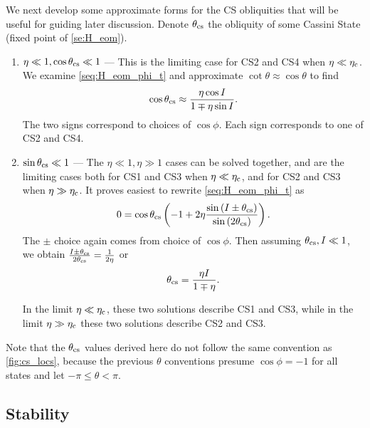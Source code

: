 \documentclass[
        fleqn,
        usenatbib,
        referee,
    ]{mnras}
\newcommand*{\p}[1]{\left(#1\right)}
\begin{document}
We next develop some approximate forms for the CS obliquities that will be
useful for guiding later discussion. Denote $\theta_{\rm cs}$ the obliquity of
some Cassini State (fixed point of \autoref{se:H_eom}).
\begin{enumerate}
    \item $\eta \ll 1, \cos \theta_{\rm cs} \ll 1$ --- This is the limiting case
        for CS2 and CS4 when $\eta \ll \eta_{\rm c}$. We examine
        \autoref{seq:H_eom_phi_t} and approximate $\cot \theta \approx \cos
        \theta$ to find
        \begin{equation}
            \cos \theta_{\rm cs} \approx \frac{\eta \cos I}
                {1 \mp \eta \sin I}.
        \end{equation}
        The two signs correspond to choices of $\cos \phi$. Each sign
        corresponds to one of CS2 and CS4.

    \item $\sin \theta_{\rm cs} \ll 1$ --- The $\eta \ll 1, \eta \gg 1$ cases
        can be solved together, and are the limiting cases both for CS1 and CS3
        when $\eta \ll \eta_{\rm c}$, and for CS2 and CS3 when $\eta \gg
        \eta_{\rm c}$. It proves easiest to rewrite \autoref{seq:H_eom_phi_t} as
        \begin{equation}
            0 = \cos \theta_{\rm cs}\p{-1 + 2\eta
                \frac{\sin \p{I \pm \theta_{\rm cs}}}{\sin \p{2\theta_{\rm
                    cs}}}}.\label{eq:rewritten_dphi}
        \end{equation}
        The $\pm$ choice again comes from choice of $\cos \phi$. Then assuming
        $\theta_{\rm cs}, I \ll 1$, we obtain $\frac{I \pm
        \theta_{\rm cs}}{2\theta_{\rm cs}} = \frac{1}{2\eta}$ or
        \begin{equation}
            \theta_{\rm cs} = \frac{\eta I}{1 \mp \eta}.
        \end{equation}

        In the limit $\eta \ll \eta_{\rm c}$, these two solutions describe CS1
        and CS3, while in the limit $\eta \gg \eta_{\rm c}$ these two solutions
        describe CS2 and CS3.
\end{enumerate}
Note that the $\theta_{\rm cs}$ values derived here do not follow the same
convention as \autoref{fig:cs_locs}, because the previous $\theta$ conventions
presume $\cos \phi = -1$ for all states and let $-\pi \leq \theta < \pi$.

\subsection{Stability}
\end{document}
